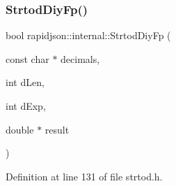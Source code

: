 \subsubsection{\texorpdfstring{StrtodDiyFp()}{StrtodDiyFp()}}
{\footnotesize\ttfamily bool rapidjson\+::internal\+::\+Strtod\+Diy\+Fp (\begin{DoxyParamCaption}\item[{const char $\ast$}]{decimals,  }\item[{int}]{d\+Len,  }\item[{int}]{d\+Exp,  }\item[{double $\ast$}]{result }\end{DoxyParamCaption})}



Definition at line 131 of file strtod.\+h.


